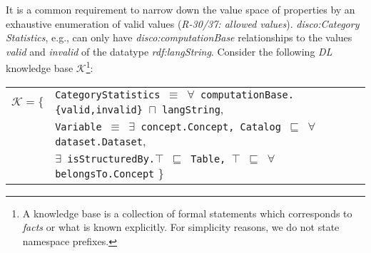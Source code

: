 \documentclass{llncs}
\newcommand{\ms}[1]{\texttt{#1}}
\newenvironment{DL}{
  \small
  \vspace{0cm}
	\begin{center}
  \begin{tabular}{c l}

}{
  \end{tabular}
	\end{center}
}
\begin{document}
It is a common requirement to narrow down the value space of properties by an exhaustive enumeration of valid values (\emph{R-30/37: allowed values}). 
\emph{disco:Category} \emph{Statistics}, e.g., can only have \emph{disco:computationBase} relationships to the values \emph{valid} and \emph{invalid} of the datatype \emph{rdf:langString}.
Consider the following \emph{DL} knowledge base $\mathcal{K}$\footnote{A knowledge base is a collection of formal statements which corresponds to \emph{facts} or what is known explicitly. For simplicity reasons, we do not state namespace prefixes.}:
\begin{center}
\begin{DL} 
$\mathcal{K}=\{$ 
	&\ms{CategoryStatistics $\equiv$ $\forall$ computationBase.\{valid,invalid\} $\sqcap$ langString}, \\
  &\ms{Variable $\equiv$ $\exists$ concept.Concept, Catalog $\sqsubseteq$ $\forall$ dataset.Dataset}, \\
  &\ms{$\exists$ isStructuredBy.$\top$ $\sqsubseteq$ Table, $\top$ $\sqsubseteq$ $\forall$ belongsTo.Concept}
\}\\ 
\end{DL}
\end{center}
\end{document}
